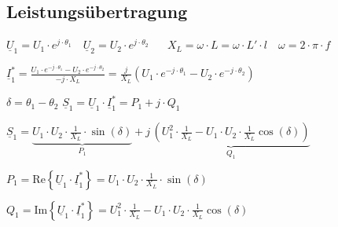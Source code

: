 \subsection{Leistungsübertragung}
    $\boxed{\underline{U}_1 = U_1 \cdot e^{j \cdot \theta_1}} \quad \boxed{\underline{U}_2 = U_2 \cdot e^{j \cdot \theta_2}}$
    $\quad$
    $\boxed{X_L = \omega \cdot L = \omega \cdot L' \cdot l} \quad \boxed{\omega = 2 \cdot \pi \cdot f}$

    \vspace{0.1cm}


    $\boxed{\underline{I}_1^* = \frac{U_1 \cdot e^{-j \cdot \theta_1} - U_2 \cdot e^{-j \cdot \theta_2}}{-j \cdot X_L}
    = \frac{j}{X_L} \left( U_1 \cdot e^{-j \cdot \theta_1} - U_2 \cdot e^{-j \cdot \theta_2} \right)}$

    \vspace{0.1cm}

    $\boxed{\delta = \theta_1 - \theta_2}$
    $\boxed{\underline{S}_1 = \underline{U}_1 \cdot \underline{I}_1^* = {P}_1 + j \cdot {Q}_1}$

    $\boxed{
    \underline{S}_1 = \underbrace{U_1 \cdot U_2 \cdot \frac{1}{X_L} \cdot \sin(\delta)}_{P_1}
    + j\, \underbrace{\left( U_1^2 \cdot \frac{1}{X_L} - U_1 \cdot U_2 \cdot \frac{1}{X_L} \cos(\delta) \right)}_{Q_1}}$

    \vspace{0.1cm}

    $\boxed{P_1 = \text{Re}\left\{ \underline{U}_1 \cdot \underline{I}_1^*\right\}= U_1 \cdot U_2 \cdot \frac{1}{X_L} \cdot \sin(\delta)}$

    \vspace{0.1cm}

    $\boxed{Q_1 = \text{Im}\left\{ \underline{U}_1 \cdot \underline{I}_1^*\right\} = U_1^2 \cdot \frac{1}{X_L} - U_1 \cdot U_2 \cdot \frac{1}{X_L} \cos(\delta)}$

